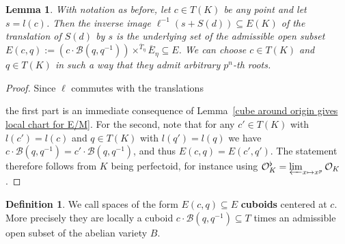 \documentclass[10pt,oneside]{amsart}
\newtheorem{lemma}[theorem]{Lemma}
\theoremstyle{definition}
\newtheorem{definition}[theorem]{Definition}
\begin{document}
	\begin{lemma}\label{cube around point gives local chart for E/M}
		With notation as before, let $c \in T(K)$ be any point and let $s=l(c)$. Then the inverse image $\ell^{-1}(s+S(d))\subseteq E(K)$ of the translation of $S(d)$ by $s$ is the underlying set of the admissible open subset $E(c,q) := (c\cdot \mathcal B(q,q^{-1}))\times^{\overline{T}_\eta}\overline{E}_\eta \subseteq E$. We can choose $c\in T(K)$ and $q\in T(K)$ in such a way that they admit arbitrary $p^n$-th roots.
	\end{lemma}
	
	\begin{proof}
		Since $\ell$ commutes with the translations
		\begin{center}
		\end{center}
		the first part is an immediate consequence of Lemma~\ref{cube around origin gives local chart for E/M}. For the second, note that for any $c'\in T(K)$ with $l(c')=l(c)$ and $q\in T(K)$ with $l(q')=l(q)$ we have $c\cdot \mathcal B(q,q^{-1}) = c'\cdot \mathcal B(q,q^{-1})$, and thus $E(c,q)=E(c',q')$. The statement therefore follows from $K$ being perfectoid, for instance using $\mathcal O_K^\flat = \varprojlim_{x\mapsto x^p}\mathcal O_K$.
	\end{proof}
    
    \begin{definition}\label{defininition of cuboid}
		We call spaces of the form $E(c,q)\subseteq E$ \textbf{cuboids} centered at $c$. More precisely they are locally a cuboid   $c\cdot\mathcal B(q,q^{-1})\subseteq T$ times an admissible open subset of the abelian variety $B$. 
	\end{definition}
    
\end{document}
